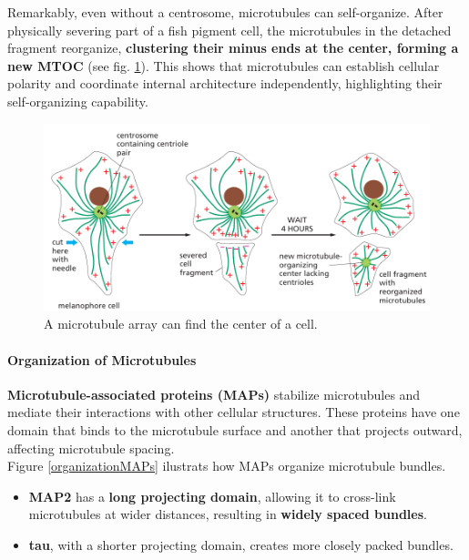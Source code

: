 \documentclass[../main.tex]{subfiles}
\begin{document}
Remarkably, even without a centrosome, microtubules can self-organize. After physically severing part of a fish pigment cell, the microtubules in the detached fragment reorganize, \textbf{clustering their minus ends at the center, forming a new MTOC} (see fig. \ref{self-organizing}). This shows that microtubules can establish cellular polarity and coordinate internal architecture independently, highlighting their self-organizing capability.

\begin{figure}[H]
	\centering
	\includegraphics[width = 0.7 \textwidth]{28}
	\caption{A microtubule array can find the center of a cell.}
	\label{self-organizing}
\end{figure}

\paragraph{Organization of Microtubules}
\textbf{Microtubule-associated proteins (MAPs)} stabilize microtubules and mediate their interactions with other cellular structures. These proteins have one domain that binds to the microtubule surface and another that projects outward, affecting microtubule spacing.\\
Figure \ref{organizationMAPs} ilustrats how MAPs organize microtubule bundles. 
\begin{itemize}
	\item \textbf{\gls{MAP2}} has a \textbf{long projecting domain}, allowing it to cross-link microtubules at wider distances, resulting in \textbf{widely spaced bundles}.
	
	\item \textbf{\gls{tau}}, with a shorter projecting domain, creates more closely packed bundles.
\end{itemize}
\end{document}
